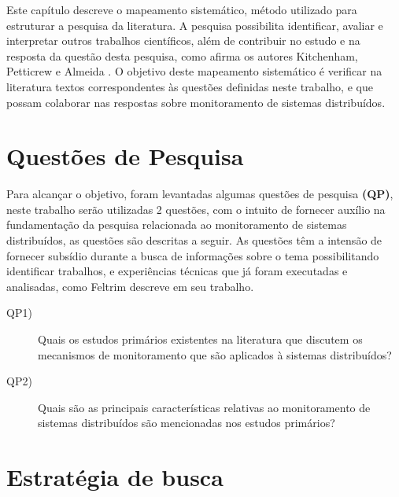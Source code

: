 \label{mapeamento_sistematico}

Este capítulo descreve o mapeamento sistemático, método utilizado para estruturar a pesquisa da literatura. A pesquisa possibilita identificar, avaliar e interpretar outros trabalhos científicos, além de contribuir no estudo e na resposta da questão desta pesquisa, como afirma os autores Kitchenham, Petticrew e Almeida \cite{kitchenham2007guidelines,petticrew2008systematic,de2018mapeamento}. O objetivo deste mapeamento sistemático é verificar na literatura textos correspondentes às questões definidas neste trabalho, e que possam colaborar nas respostas sobre monitoramento de sistemas distribuídos.


\section{Questões de Pesquisa}
\label{questoes1e2}

Para alcançar o objetivo, foram levantadas algumas questões de pesquisa \textbf{(QP)}, neste trabalho serão utilizadas 2 questões, com o intuito de fornecer auxílio na fundamentação da pesquisa relacionada ao monitoramento de sistemas distribuídos, as questões são descritas a seguir. As questões têm a intensão de fornecer subsídio durante a busca de informações sobre o tema possibilitando identificar trabalhos, e experiências técnicas que já foram executadas e analisadas, como Feltrim\cite{feltrim2004abordagem} descreve em seu trabalho.

\begin{description}
\item[QP1)] Quais os estudos primários existentes na literatura que discutem os mecanismos de monitoramento 
que são aplicados à sistemas distribuídos?
\item[QP2)] Quais são as principais características relativas ao monitoramento de sistemas distribuídos são mencionadas nos estudos primários?
\end{description}


\section{Estratégia de busca}
\label{sec:stringbusca}

